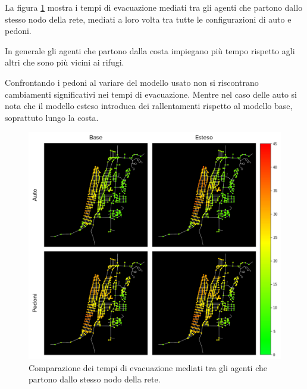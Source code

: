 \pagebreak

La figura \ref{fig:analisi-comparison-ev-times-map} mostra i tempi di evacuazione mediati tra gli agenti che partono dallo stesso nodo della rete,
mediati a loro volta tra tutte le configurazioni di auto e pedoni.

In generale gli agenti che partono dalla costa impiegano più tempo rispetto agli altri che sono più vicini ai rifugi.

Confrontando i pedoni al variare del modello usato non si riscontrano cambiamenti significativi nei tempi di evacuazione.
Mentre nel caso delle auto si nota che il modello esteso introduca dei rallentamenti rispetto al modello base, soprattuto lungo la costa.

\begin{figure}[ht]
    \centering
    \includegraphics[width=\textwidth]{images/analisi/comparison-evtimes-map.png}
    \caption{Comparazione dei tempi di evacuazione mediati tra gli agenti che partono dallo stesso nodo della rete. }
    \label{fig:analisi-comparison-ev-times-map}
\end{figure}

\pagebreak



